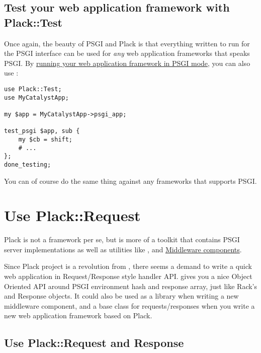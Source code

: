 \section{Test your web application framework with
Plack::Test}\label{test-your-web-application-framework-with-placktest}

Once again, the beauty of PSGI and Plack is that everything written to
run for the PSGI interface can be used for \emph{any} web application
frameworks that speaks PSGI. By
\href{http://advent.plackperl.org/2009/12/day-7-use-web-application-framework-in-psgi.html}{running
your web application framework in PSGI mode}, you can also use
:

\begin{lstlisting}
use Plack::Test;
use MyCatalystApp;

my $app = MyCatalystApp->psgi_app;

test_psgi $app, sub {
    my $cb = shift;
    # ...
};
done_testing;
\end{lstlisting}

You can of course do the same thing against any frameworks that supports
PSGI.

\chapter{Use Plack::Request}\label{day-14-use-plackrequest}

Plack is not a framework per se, but is more of a toolkit that contains
PSGI server implementations as well as utilities like
\href{http://advent.plackperl.org/2009/12/day-3-using-plackup.html}{},
\href{http://advent.plackperl.org/2009/12/day-13-use-placktest-to-test-your-application.html}{}
and
\href{http://advent.plackperl.org/2009/12/day-10-using-plack-middleware.html}{Middleware
components}.

Since Plack project is a revolution from
\href{http://search.cpan.org/perldoc?HTTP::Engine}{}, there
seems a demand to write a quick web application in Request/Response
style handler API.  gives you a nice Object Oriented API
around PSGI environment hash and response array, just like Rack's
 and Response objects. It could also be used as a library
when writing a new middleware component, and a base class for
requests/responses when you write a new web application framework based
on Plack.

\section{Use Plack::Request and
Response}\label{use-plackrequest-and-response}


